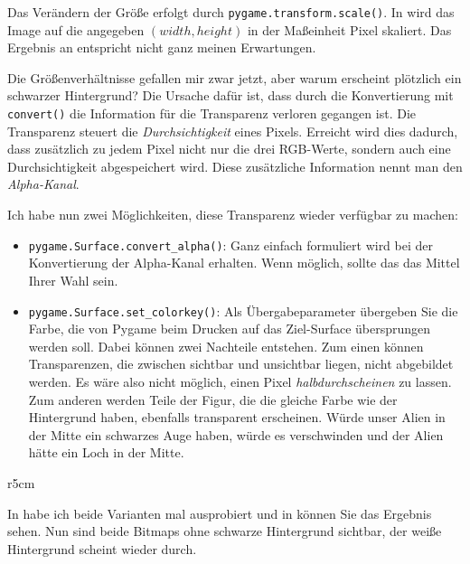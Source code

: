 Das Verändern der Größe erfolgt durch \texttt{pygame\-.trans\-form\-.scale()}. In  wird das Image auf die angegeben $(width, height)$ in der Maßeinheit Pixel skaliert. Das Ergebnis an  entspricht nicht ganz meinen Erwartungen.  

Die Größenverhältnisse gefallen mir zwar jetzt, aber warum erscheint plötzlich ein schwarzer Hintergrund? Die Ursache dafür ist, dass durch die Konvertierung mit \texttt{convert()} die Information für die Transparenz verloren gegangen ist. Die Transparenz steuert die \emph{Durchsichtigkeit} eines Pixels. Erreicht wird dies dadurch, dass zusätzlich zu jedem Pixel nicht nur die drei RGB-Werte, sondern auch eine Durchsichtigkeit abgespeichert wird. Diese zusätzliche Information nennt man den \emph{Alpha-Kanal}.

Ich habe nun zwei Möglichkeiten, diese Transparenz wieder verfügbar zu machen:
\begin{itemize}
	\item \texttt{pygame.Surface.convert\_alpha()}: Ganz einfach formuliert wird bei der Konvertierung der Alpha-Kanal erhalten. Wenn möglich, sollte das das Mittel Ihrer Wahl sein.
	
	\item \texttt{pygame.Surface.set\_colorkey()}: Als Übergabeparameter übergeben Sie die Farbe, die von Pygame beim Drucken auf das Ziel-Surface übersprungen werden soll. Dabei können zwei Nachteile entstehen. Zum einen können Transparenzen, die zwischen sichtbar und unsichtbar liegen, nicht abgebildet werden. Es wäre also nicht möglich, einen Pixel \emph{halbdurchscheinen} zu lassen. Zum anderen werden Teile der Figur, die die gleiche Farbe wie der Hintergrund haben, ebenfalls transparent erscheinen. Würde unser Alien in der Mitte ein schwarzes Auge haben, würde es verschwinden und der Alien hätte ein Loch in der Mitte.
\end{itemize}



\begin{wrapfigure}[9]{r}{5cm}
    \vspace{-1.5em}
\end{wrapfigure}In  habe ich beide Varianten mal ausprobiert und in  können Sie das Ergebnis sehen. Nun sind beide Bitmaps ohne schwarze Hintergrund sichtbar, der weiße Hintergrund scheint wieder durch.

